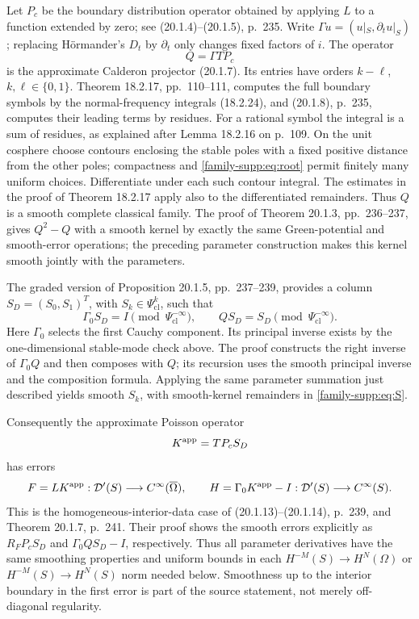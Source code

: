 \documentclass[11pt]{article}
\theoremstyle{definition}
\theoremstyle{remark}
\numberwithin{equation}{section}
\providecommand{\D}{\mathcal D}
\providecommand{\Ps}{\Psi_{\mathrm{cl}}}
\begin{document}
Let $P_c$ be the boundary distribution operator obtained by applying $L$
to a function extended by zero; see (20.1.4)--(20.1.5), p.~235. Write
$\Gamma u=(u|_S,\partial_tu|_S)$; replacing H\"ormander's $D_t$ by
$\partial_t$ only changes fixed factors of $i$. The operator
\[
 Q=\Gamma T P_c
\]
is the approximate Calderon projector (20.1.7). Its entries have orders
$k-\ell$, $k,\ell\in\{0,1\}$. Theorem 18.2.17, pp.~110--111, computes
the full boundary symbols by the normal-frequency integrals (18.2.24),
and (20.1.8), p.~235, computes their leading terms by residues.
For a rational symbol the integral is a sum of residues, as explained
after Lemma 18.2.16 on p.~109. On the unit cosphere choose contours enclosing
the stable poles with a fixed positive distance from the other poles;
compactness and \eqref{family-supp:eq:root} permit finitely many uniform choices.
Differentiate under each such contour integral. The estimates in the
proof of Theorem 18.2.17 apply also to the differentiated remainders.
Thus $Q$ is a smooth complete classical family. The proof of Theorem
20.1.3, pp.~236--237, gives $Q^2-Q$ with a smooth kernel by exactly the
same Green-potential and smooth-error operations; the preceding parameter
construction makes this kernel smooth jointly with the parameters.

The graded version of Proposition 20.1.5, pp.~237--239, provides a column
$S_D=(S_0,S_1)^T$, with $S_k\in\Ps^k$, such that
\begin{equation}\label{family-supp:eq:S}
 \Gamma_0 S_D=I\pmod{\Ps^{-\infty}},\qquad
 QS_D=S_D\pmod{\Ps^{-\infty}}.
\end{equation}
Here $\Gamma_0$ selects the first Cauchy component. Its principal inverse
exists by the one-dimensional stable-mode check above. The proof constructs
the right inverse of $\Gamma_0Q$ and then composes with $Q$; its recursion
uses the smooth principal inverse and the composition formula. Applying
the same parameter summation just described yields smooth $S_k$, with
smooth-kernel remainders in \eqref{family-supp:eq:S}.

Consequently the approximate Poisson operator
\begin{equation}\label{family-supp:eq:Kapp}
 K^{\rm app}=TP_cS_D
\end{equation}
has errors
\begin{equation}\label{family-supp:eq:errors}
 F=LK^{\rm app}:\D'(S)\longrightarrow C^\infty(\overline\Omega),
 \qquad H=\Gamma_0K^{\rm app}-I:\D'(S)\longrightarrow C^\infty(S).
\end{equation}
This is the homogeneous-interior-data case of (20.1.13)--(20.1.14), p.~239,
and Theorem 20.1.7, p.~241. Their proof shows the smooth errors explicitly
as $R_FP_cS_D$ and $\Gamma_0QS_D-I$, respectively. Thus all parameter
derivatives have the same smoothing properties and uniform bounds in
each $H^{-M}(S)\to H^N(\Omega)$ or $H^{-M}(S)\to H^N(S)$ norm needed
below. Smoothness up to the interior boundary in the first error is part
of the source statement, not merely off-diagonal regularity.
\end{document}
